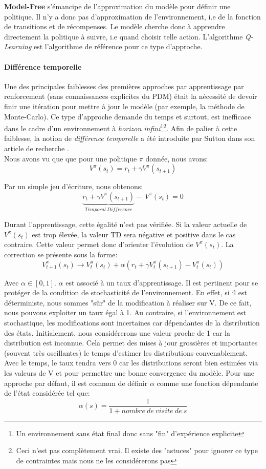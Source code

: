 \noindent \textbf{Model-Free} s'émancipe de l'approximation du modèle pour définir une politique. Il n'y a donc pas d'approximation de l'environnement, i.e de la fonction de transitions et de récompenses. Le modèle cherche donc à apprendre directement la politique à suivre, i.e quand choisir telle action. L'algorithme \textit{Q-Learning}\cite{qlearning} est l'algorithme de référence pour ce type d'approche.

\paragraph{Différence temporelle}
Une des principales faiblesses des premières approches par apprentissage par renforcement (sans connaissances explicites du PDM) était la nécessité de devoir finir une itération pour mettre à jour le modèle (par exemple, la méthode de Monte-Carlo). Ce type d'approche demande du temps et surtout, est inefficace dans le cadre d'un environnement à \textit{horizon infini}\footnote{Un environnement sans état final donc sans "fin" d'expérience explicite}\footnote{Ceci n'est pas complètement vrai. Il existe des "astuces" pour ignorer ce type de contraintes mais nous ne les considérerons pas}. Afin de palier à cette faiblesse, la notion de \textit{différence temporelle} a été introduite par Sutton dans son article de recherche \cite{difftemp}.\\

\noindent Nous avons vu que que pour une politique $\pi$ donnée, nous avons:
$$V^\pi (s_t)=r_t+\gamma V^\pi (s_{t+1})$$

\noindent Par un simple jeu d'écriture, nous obtenons:
$$\underbrace{r_t+\gamma V^\pi (s_{t+1})}_{Temporal \ Difference}- \ V^\pi (s_t)=0$$

\noindent Durant l'apprentissage, cette égalité n'est pas vérifiée. Si la valeur actuelle de $V^\pi (s_t)$ est trop élevée, la valeur TD sera négative et positive dans le cas contraire. Cette valeur permet donc d'orienter l'évolution de $V^\pi (s_t)$. La correction se présente sous la forme:
$$V^\pi_{t+1}(s_{t}) \rightarrow V_t^\pi (s_t)+\alpha (r_t+\gamma V_t^\pi (s_{t+1})-V_t^\pi (s_t))$$

\noindent Avec $\alpha \in [0,1]$. $\alpha$ est associé à un taux d'apprentissage. Il est pertinent pour se protéger de la condition de stochasticité de l'environnement. En effet, si il est déterministe, nous sommes "sûr" de la modification à réaliser sur V. De ce fait, nous pouvons exploiter un taux égal à 1. Au contraire, si l'environnement est stochastique, les modifications sont incertaines car dépendantes de la distribution des états. Initialement, nous considérerons une valeur proche de 1 car la distribution est inconnue. Cela permet des mises à jour grossières et importantes (souvent très oscillantes) le temps d'estimer les distributions convenablement. Avec le temps, le taux tendra vers 0 car les distributions seront bien estimées via les valeurs de V et pour permettre une bonne convergence du modèle. Pour une approche par défaut, il est commun de définir $\alpha$ comme une fonction dépendante de l'état considérée tel que:
$$\alpha(s)=\frac{1}{1+nombre \ de \ visite \ de \ s}$$

